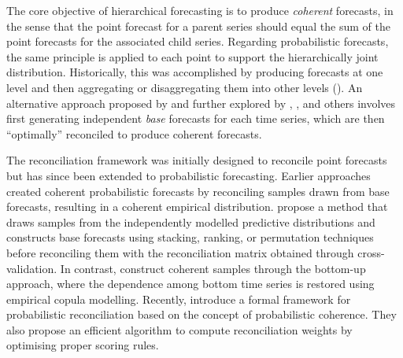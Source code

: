 \documentclass[a4paper,review,12pt,authoryear]{elsarticle}
\begin{document}
The core objective of hierarchical forecasting is to produce \textit{coherent} forecasts,
in the sense that the point forecast for a parent series should equal the sum of the point forecasts for the associated child series.
Regarding probabilistic forecasts, the same principle is applied to each point to support the hierarchically joint distribution.
Historically, this was accomplished by producing forecasts at one level
and then aggregating or disaggregating them into other levels (\citealp{fliednerHierarchicalForecastingIssues2001}).
An alternative approach proposed by \cite{hyndmanOptimalCombinationForecasts2011} and further explored by \cite{wickramasuriyaOptimalForecastReconciliation2019}, \cite{ anagiotelisForecastReconciliationGeometric2021}, and others involves
first generating independent \textit{base} forecasts for each time series,
which are then ``optimally'' reconciled to produce coherent forecasts.

The reconciliation framework was initially designed to reconcile point forecasts but has since been extended to probabilistic forecasting.
Earlier approaches created coherent probabilistic forecasts by reconciling samples drawn from base forecasts, resulting in a coherent empirical distribution.
\cite{jeonProbabilisticForecastReconciliation2019} propose a method that draws samples from the independently modelled predictive distributions and constructs base forecasts using stacking, ranking, or permutation techniques before reconciling them with the reconciliation matrix obtained through cross-validation.
In contrast, \cite{bentaiebHierarchicalProbabilisticForecasting2020} construct coherent samples through the bottom-up approach,
where the dependence among bottom time series is restored using empirical copula modelling.
Recently, \cite{panagiotelisProbabilisticForecastReconciliation2022} introduce a formal framework for probabilistic reconciliation based on the concept of probabilistic coherence.
They also propose an efficient algorithm to compute reconciliation weights by optimising proper scoring rules.
\end{document}
